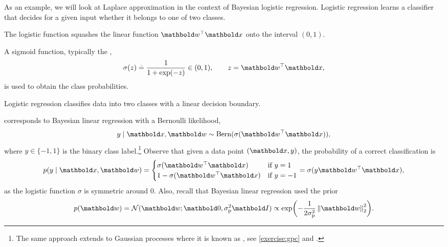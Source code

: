 As an example, we will look at Laplace approximation in the context of Bayesian logistic regression.
Logistic regression learns a classifier that decides for a given input whether it belongs to one of two classes.
{\def\par{\let\par\endgraf}\begin{marginfigure}
  \caption{The logistic function squashes the linear function $\transpose{\vw}\vx$ onto the interval $(0,1)$.}\label{fig:logistic_function}
\end{marginfigure}}%
A sigmoid function, typically the , \begin{align}
  \sigma(z) \defeq \frac{1}{1+\exp(-z)} \in (0, 1), \qquad z = \transpose{\vw} \vx, \label{eq:logistic_function}
\end{align} is used to obtain the class probabilities.
{\def\par{\let\par\endgraf}\begin{marginfigure}
  \caption{Logistic regression classifies data into two classes with a linear decision boundary.}
\end{marginfigure}}%
 corresponds to Bayesian linear regression with a Bernoulli likelihood, \begin{align}
  y \mid \vx, \vw \sim \Bern{\sigma(\transpose{\vw} \vx)},
\end{align} where ${y \in \{-1, 1\}}$ is the binary class label.\footnote[][0.5\baselineskip]{The same approach extends to Gaussian processes where it is known as , see \cref{exercise:gpc} and \cite{gpc}.}
Observe that given a data point $(\vx,y)$, the probability of a correct classification is \begin{align}
  p(y \mid \vx, \vw) = \begin{cases}
    \sigma(\transpose{\vw} \vx) & \text{if $y = 1$} \\
    1 - \sigma(\transpose{\vw} \vx) & \text{if $y = -1$}
  \end{cases} = \sigma(y \transpose{\vw} \vx) \label{eq:logistic_regression_prob},
\end{align} as the logistic function $\sigma$ is symmetric around $0$.
Also, recall that Bayesian linear regression used the prior \begin{align*}
  p(\vw) = \N[\vw]{\vzero}{\sigmap^2 \mI} \propto \exp\parentheses*{-\frac{1}{2 \sigmap^2} \norm{\vw}_2^2}.
\end{align*}

